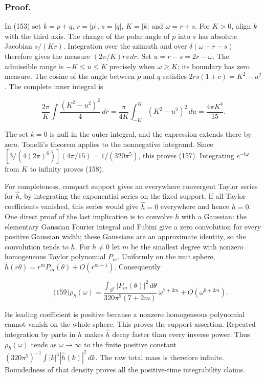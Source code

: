 \subsubsection{Proof.}\label{full-local-spectrum-md-proof.-1}

In (153) set \(k=p+q\), \(r=|p|\), \(s=|q|\), \(K=|k|\) and
\(\omega=r+s\). For \(K>0\), align \(k\) with the third axis. The change
of the polar angle of \(p\) into \(s\) has absolute Jacobian \(s/(Kr)\).
Integration over the azimuth and over \(\delta(\omega-r-s)\) therefore
gives the measure \((2\pi/K)rs\,dr\). Set \(u=r-s=2r-\omega\). The
admissible range is \(-K\le u\le K\) precisely when \(\omega\ge K\); its
boundary has zero measure. The cosine of the angle between \(p\) and
\(q\) satisfies \(2rs(1+c)=K^2-u^2\). The complete inner integral is

\[
\frac{2\pi}{K}\int \frac{ (K^2-u^2)^2}{4}\,dr
 = \frac{\pi}{4K}\int_{-K}^K(K^2-u^2)^2\,du
 = \frac{4\pi K^4}{15}.
\]

The set \(k=0\) is null in the outer integral, and the expression
extends there by zero. Tonelli's theorem applies to the nonnegative
integrand. Since \([3/(4(2\pi)^6)](4\pi/15)=1/(320\pi^5)\), this proves
(157). Integrating \(e^{-t\omega}\) from \(K\) to infinity proves (158).

For completeness, compact support gives an everywhere convergent Taylor
series for \(\widehat h\), by integrating the exponential series on the
fixed support. If all Taylor coefficients vanished, this series would
give \(\widehat h=0\) everywhere and hence \(h=0\). One direct proof of
the last implication is to convolve \(h\) with a Gaussian: the
elementary Gaussian Fourier integral and Fubini give a zero convolution
for every positive Gaussian width; these Gaussians are an approximate
identity, so the convolution tends to \(h\). For \(h\ne0\) let \(m\) be
the smallest degree with nonzero homogeneous Taylor polynomial \(P_m\).
Uniformly on the unit sphere,
\(\widehat h(r\theta)=r^mP_m(\theta)+O(r^{m+1})\). Consequently

\[
\qquad\text{(159)}
 \rho_h(\omega)=
 \frac{\int_{S^2}|P_m(\theta)|^2\,d\theta}
       {320\pi^5(7+2m)}\,\omega^{7+2m}
       +O(\omega^{8+2m}).
\]

Its leading coefficient is positive because a nonzero homogeneous
polynomial cannot vanish on the whole sphere. This proves the support
assertion. Repeated integration by parts in \(h\) makes \(\widehat h\)
decay faster than every inverse power. Thus \(\rho_h(\omega)\) tends as
\(\omega\to\infty\) to the finite positive constant
\((320\pi^5)^{-1}\int |k|^4|\widehat h(k)|^2\,dk\). The raw total mass
is therefore infinite. Boundedness of that density proves all the
positive-time integrability claims.

